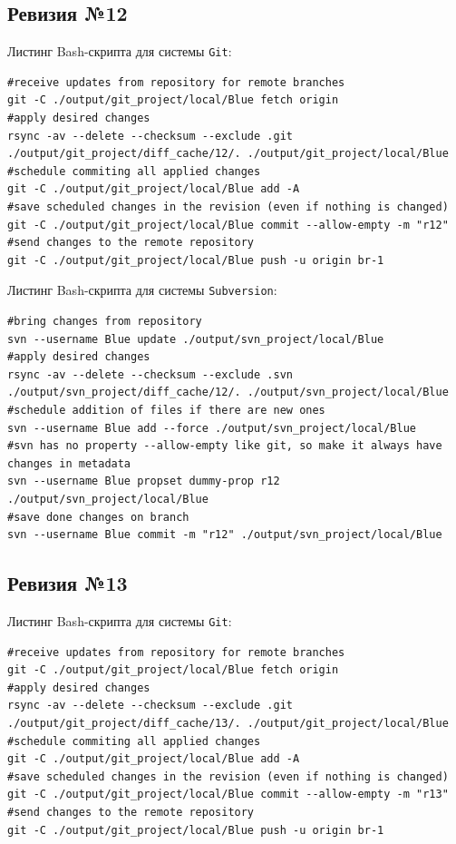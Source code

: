 \subsection{Ревизия №12}

Листинг Bash-скрипта для системы \texttt{Git}:
\begin{lstlisting}
#receive updates from repository for remote branches
git -C ./output/git_project/local/Blue fetch origin
#apply desired changes
rsync -av --delete --checksum --exclude .git ./output/git_project/diff_cache/12/. ./output/git_project/local/Blue
#schedule commiting all applied changes
git -C ./output/git_project/local/Blue add -A
#save scheduled changes in the revision (even if nothing is changed)
git -C ./output/git_project/local/Blue commit --allow-empty -m "r12"
#send changes to the remote repository
git -C ./output/git_project/local/Blue push -u origin br-1
\end{lstlisting}

Листинг Bash-скрипта для системы \texttt{Subversion}:
\begin{lstlisting}
#bring changes from repository
svn --username Blue update ./output/svn_project/local/Blue
#apply desired changes
rsync -av --delete --checksum --exclude .svn ./output/svn_project/diff_cache/12/. ./output/svn_project/local/Blue
#schedule addition of files if there are new ones
svn --username Blue add --force ./output/svn_project/local/Blue
#svn has no property --allow-empty like git, so make it always have changes in metadata
svn --username Blue propset dummy-prop r12 ./output/svn_project/local/Blue
#save done changes on branch
svn --username Blue commit -m "r12" ./output/svn_project/local/Blue
\end{lstlisting}


\subsection{Ревизия №13}

Листинг Bash-скрипта для системы \texttt{Git}:
\begin{lstlisting}
#receive updates from repository for remote branches
git -C ./output/git_project/local/Blue fetch origin
#apply desired changes
rsync -av --delete --checksum --exclude .git ./output/git_project/diff_cache/13/. ./output/git_project/local/Blue
#schedule commiting all applied changes
git -C ./output/git_project/local/Blue add -A
#save scheduled changes in the revision (even if nothing is changed)
git -C ./output/git_project/local/Blue commit --allow-empty -m "r13"
#send changes to the remote repository
git -C ./output/git_project/local/Blue push -u origin br-1
\end{lstlisting}

